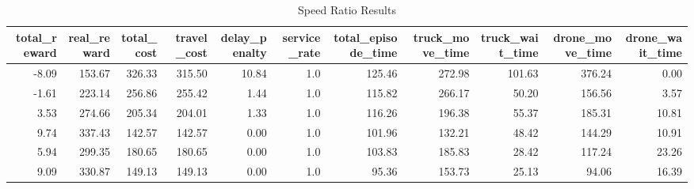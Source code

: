 \begin{table}
\centering
\caption{Speed Ratio Results}
\begin{tabular}{rrrrrrrrrrr}
\toprule
 total\_reward &  real\_reward &  total\_cost &  travel\_cost &  delay\_penalty &  service\_rate &  total\_episode\_time &  truck\_move\_time &  truck\_wait\_time &  drone\_move\_time &  drone\_wait\_time \\
\midrule
        -8.09 &       153.67 &      326.33 &       315.50 &          10.84 &           1.0 &              125.46 &           272.98 &           101.63 &           376.24 &             0.00 \\
        -1.61 &       223.14 &      256.86 &       255.42 &           1.44 &           1.0 &              115.82 &           266.17 &            50.20 &           156.56 &             3.57 \\
         3.53 &       274.66 &      205.34 &       204.01 &           1.33 &           1.0 &              116.26 &           196.38 &            55.37 &           185.31 &            10.81 \\
         9.74 &       337.43 &      142.57 &       142.57 &           0.00 &           1.0 &              101.96 &           132.21 &            48.42 &           144.29 &            10.91 \\
         5.94 &       299.35 &      180.65 &       180.65 &           0.00 &           1.0 &              103.83 &           185.83 &            28.42 &           117.24 &            23.26 \\
         9.09 &       330.87 &      149.13 &       149.13 &           0.00 &           1.0 &               95.36 &           153.73 &            25.13 &            94.06 &            16.39 \\
\bottomrule
\end{tabular}
\end{table}
